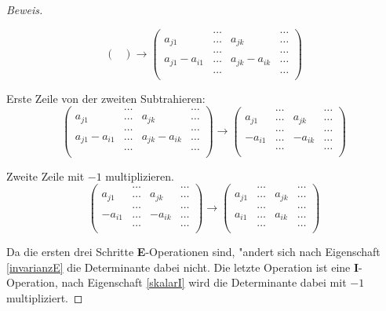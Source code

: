 \begin{proof}[Beweis]
\begin{compactenum}
\[\begin{pmatrix}
\end{pmatrix}
\rightarrow
\begin{pmatrix}
             &\dots&             &\dots\\
a_{j1}       &\dots&a_{jk}       &\dots\\
             &\dots&             &\dots\\
a_{j1}-a_{i1}&\dots&a_{jk}-a_{ik}&\dots\\
             &\dots&             &\dots\\
\end{pmatrix}
\]
\item  Erste Zeile von der zweiten Subtrahieren:
\[
\begin{pmatrix}
             &\dots&             &\dots\\
a_{j1}       &\dots&a_{jk}       &\dots\\
             &\dots&             &\dots\\
a_{j1}-a_{i1}&\dots&a_{jk}-a_{ik}&\dots\\
             &\dots&             &\dots\\
\end{pmatrix}
\rightarrow
\begin{pmatrix}
       &\dots&       &\dots\\
a_{j1} &\dots&a_{jk} &\dots\\
       &\dots&       &\dots\\
-a_{i1}&\dots&-a_{ik}&\dots\\
       &\dots&       &\dots\\
\end{pmatrix}
\]
\item Zweite Zeile mit $-1$ multiplizieren.
\[
\begin{pmatrix}
       &\dots&       &\dots\\
a_{j1} &\dots&a_{jk} &\dots\\
       &\dots&       &\dots\\
-a_{i1}&\dots&-a_{ik}&\dots\\
       &\dots&       &\dots\\
\end{pmatrix}
\rightarrow
\begin{pmatrix}
      &\dots&      &\dots\\
a_{j1}&\dots&a_{jk} &\dots\\
      &\dots&      &\dots\\
a_{i1}&\dots&a_{ik}&\dots\\
      &\dots&      &\dots\\
\end{pmatrix}
\]
\end{compactenum}
Da die ersten drei Schritte {\bf E}-Operationen sind, "andert sich nach
Eigenschaft \ref{invarianzE} die Determinante dabei nicht.
Die letzte
Operation ist eine {\bf I}-Operation, nach Eigenschaft \ref{skalarI}
wird die Determinante dabei mit $-1$ multipliziert.
\end{proof}

